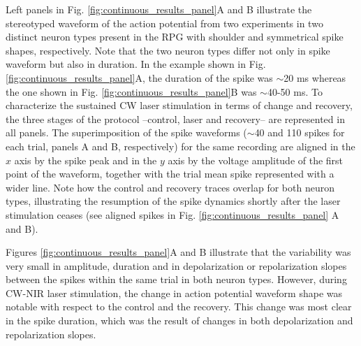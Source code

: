 Left panels in Fig. \ref{fig:continuous_results_panel}A and B illustrate the stereotyped waveform of the action potential from two experiments in two distinct neuron types present in the RPG with shoulder and symmetrical spike shapes, respectively. Note that the two neuron types differ not only in spike waveform but also in duration. In the example shown in Fig. \ref{fig:continuous_results_panel}A, the duration of the spike was $\sim$20 ms whereas the one shown in Fig. \ref{fig:continuous_results_panel}B was $\sim$40-50 ms. To characterize the sustained CW laser stimulation in terms of change and recovery, the three stages of the protocol --control, laser and recovery-- are represented in all panels. The superimposition of the spike waveforms ($\sim$40 and 110 spikes for each trial, panels A and B, respectively) for the same recording are aligned in the $x$ axis by the spike peak and in the $y$ axis by the voltage amplitude of the first point of the waveform, together with the trial mean spike represented with a wider line. Note how the control and recovery traces overlap for both neuron types, illustrating the resumption of the spike dynamics shortly after the laser stimulation ceases (see aligned spikes in Fig. \ref{fig:continuous_results_panel} A and B).

Figures \ref{fig:continuous_results_panel}A and B illustrate that the variability was very small in amplitude, duration and in depolarization or repolarization slopes between the spikes within the same trial in both neuron types. However, during CW-NIR laser stimulation, the change in action potential waveform shape was notable with respect to the control and the recovery. This change was most clear in the spike duration, which was the result of changes in both depolarization and repolarization slopes. 

